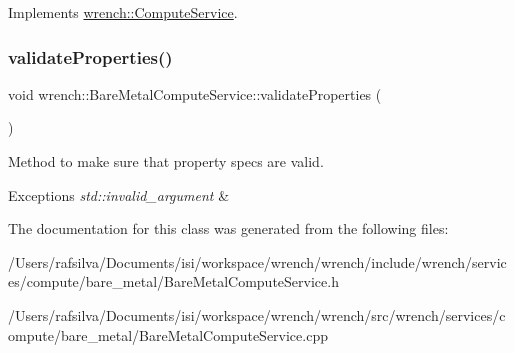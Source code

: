 Implements \hyperlink{classwrench_1_1_compute_service}{wrench\+::\+Compute\+Service}.

\mbox{\label{classwrench_1_1_bare_metal_compute_service_a199bba66e56383b91125026715bde9cf}} 
\subsubsection{\texorpdfstring{validate\+Properties()}{validateProperties()}}
{\footnotesize\ttfamily void wrench\+::\+Bare\+Metal\+Compute\+Service\+::validate\+Properties (\begin{DoxyParamCaption}{ }\end{DoxyParamCaption})}



Method to make sure that property specs are valid. 


\begin{DoxyExceptions}{Exceptions}
{\em std\+::invalid\+\_\+argument} & \\
\hline
\end{DoxyExceptions}


The documentation for this class was generated from the following files\+:\begin{DoxyCompactItemize}
\item 
/\+Users/rafsilva/\+Documents/isi/workspace/wrench/wrench/include/wrench/services/compute/bare\+\_\+metal/Bare\+Metal\+Compute\+Service.\+h\item 
/\+Users/rafsilva/\+Documents/isi/workspace/wrench/wrench/src/wrench/services/compute/bare\+\_\+metal/Bare\+Metal\+Compute\+Service.\+cpp\end{DoxyCompactItemize}
